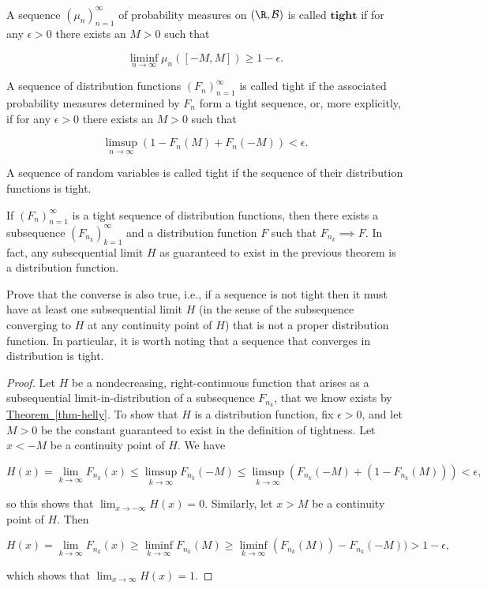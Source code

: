 \begin{defn}
A sequence $(\mu_n)_{n=1}^\infty$ of probability
measures on $(\R,{\cal B})$ is called $\textbf{tight}$
if for any $\epsilon>0$ there exists an $M>0$ such
that

\[
\liminf_{n\to\infty} \mu_n([-M,M]) \ge 1-\epsilon.
\]

\noindent A sequence of distribution functions
$(F_n)_{n=1}^\infty$ is called tight if the
associated probability measures determined by $F_n$
form a tight sequence, or, more explicitly, if for any
$\epsilon>0$ there exists an $M>0$ such that

\[
\limsup_{n\to\infty} (1-F_n(M)+F_n(-M)) < \epsilon.
\]

\noindent A sequence of random variables is called tight if the
sequence of their distribution functions is tight.
\end{defn}

\begin{thm}
If $(F_n)_{n=1}^\infty$ is a tight sequence of
distribution functions, then there exists a
subsequence $(F_{n_k})_{k=1}^\infty$ and a
distribution function $F$ such that
$F_{n_k} \implies F$. In fact, any subsequential
limit $H$ as guaranteed to exist in the previous
theorem is a distribution function.
\end{thm}

\begin{xexercise}
Prove that the converse is also true, i.e., if a
sequence is not tight then it must have at least one
subsequential limit $H$ (in the sense of the
subsequence converging to $H$ at any continuity point
of $H$) that is not a proper distribution function.
In particular, it is worth noting that a sequence that
converges in distribution is tight.
\end{xexercise}

\begin{proof}
Let $H$ be a nondecreasing, right-continuous function
that arises as a subsequential limit-in-distribution
of a subsequence $F_{n_k}$, that we know exists by
\hyperref[thm-helly]{Theorem~\ref*{thm-helly}}. To show that $H$ is a
distribution function, fix $\epsilon>0$, and let $M>0$
be the constant guaranteed to exist in the definition
of tightness. Let $x<-M$ be a continuity point of $H$.
We have

\[
H(x)=\lim_{k\to\infty} F_{n_k}(x) \le \limsup_{k\to\infty} F_{n_k}(-M) \le \limsup_{k\to\infty} (F_{n_k}(-M)+(1-F_{n_k}(M)) ) < \epsilon,
\]

\noindent so this shows that $\lim_{x\to-\infty} H(x) = 0.$
Similarly, let $x>M$ be a continuity point of $H$.
Then

\[
H(x)=\lim_{k\to\infty} F_{n_k}(x) \ge \liminf_{k\to\infty} F_{n_k}(M) \ge \liminf_{k\to\infty} (F_{n_k}(M))-F_{n_k}(-M) ) > 1-\epsilon,
\]

\noindent which shows that $\lim_{x\to\infty} H(x)=1.$
\end{proof}


